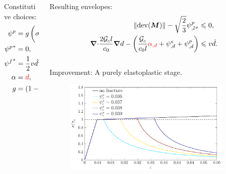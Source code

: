 \begin{frame}
\begin{overlayarea}{\textwidth}{0.4\textwidth}
{\begin{columns}
\begin{column}{0.4\textwidth}
          Constitutive choices:
          \begin{align*}
            \psi^p     & = g \left( \sigma_y \ep + \dfrac{1}{2} H \ep^2 \right), \\
            {\psi^p}^* & = 0,                                                    \\
            {\psi^f}^* & = \dfrac{1}{2} v \dot{d}^2,                             \\
            \alpha     & = \textcolor{red}{d},                                   \\
            g          & = (1-d)^2.                                              
          \end{align*}
        \end{column}
        \begin{column}{0.6\textwidth}
          Resulting envelopes:
          \begin{align*}
            \norm{\dev(\bfM)} - \sqrt{\dfrac{2}{3}} \psi^p_{,\ep}                                                                                & \leqslant 0,         \\
            \divergence \dfrac{2\Gc l}{c_0} \grad d - \left( \dfrac{\Gc}{c_0 l} \textcolor{red}{\alpha_{,d}} + \psi^e_{,d} + \psi^p_{,d} \right) & \leqslant v \dot{d}. 
          \end{align*}
          \begin{columns}
            \begin{column}[t]{0.5\textwidth}
              Improvement: A purely elastoplastic stage.
              \begin{figure}
                \centering
                \includegraphics[width=0.9\textwidth]{theory/figures/Chapter5-homogenized-compare_alpha-EPD_xi_1}
              \end{figure}
            \end{column}

\end{columns}
\end{column}
\end{columns}}
\end{overlayarea}
\end{frame}
